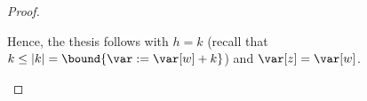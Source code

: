 \begin{proof}
\begin{itemize}
    Hence, the thesis follows with \(h = k\) (recall that
    \(k \leq |k| = \bound{\var := \var[w] + k}\)) and
    \(\var[z] = \var[w]\).
  \end{itemize}

  
  
  
    
    
    
  
  
  \medskip
  

\end{proof}
